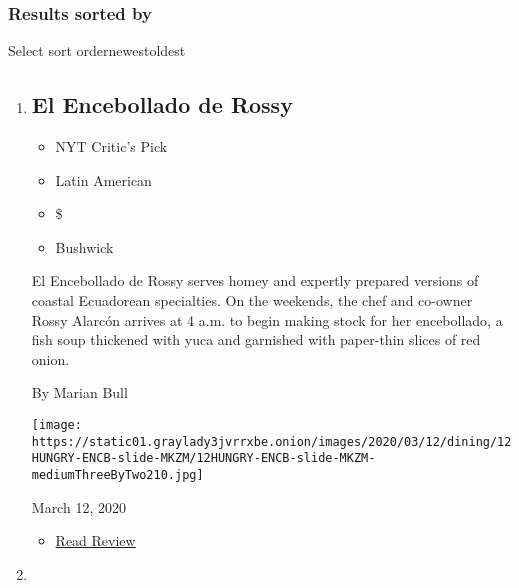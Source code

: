 \hypertarget{results--sorted-by-}{%
\subsubsection{\texorpdfstring{Results sorted by
}{Results  sorted by }}\label{results--sorted-by-}}

Select sort ordernewestoldest

\begin{enumerate}
\def\labelenumi{\arabic{enumi}.}
\item
  \href{https://www.nytimes3xbfgragh.onion/2020/03/12/dining/el-encebollado-de-rossy-review.html}{}

  \hypertarget{el-encebollado-de-rossy}{%
  \subsection{El Encebollado de Rossy}\label{el-encebollado-de-rossy}}

  \begin{itemize}
  \tightlist
  \item
    NYT Critic's Pick
  \item
    Latin American
  \item
    \$
  \item
    Bushwick
  \end{itemize}

  El Encebollado de Rossy serves homey and expertly prepared versions of
  coastal Ecuadorean specialties. On the weekends, the chef and co-owner
  Rossy Alarcón arrives at 4 a.m. to begin making stock for her
  encebollado, a fish soup thickened with yuca and garnished with
  paper-thin slices of red onion.

  By Marian Bull

  \texttt{[image: https://static01.graylady3jvrrxbe.onion/images/2020/03/12/dining/12HUNGRY-ENCB-slide-MKZM/12HUNGRY-ENCB-slide-MKZM-mediumThreeByTwo210.jpg]}

  March 12, 2020

  \begin{itemize}
  \tightlist
  \item
    \href{https://www.nytimes3xbfgragh.onion/2020/03/12/dining/el-encebollado-de-rossy-review.html?rref=collection\%2Fcollection\%2Frestaurant-guide}{Read
    Review}
  \end{itemize}
\item
  \href{https://www.nytimes3xbfgragh.onion/2020/03/10/dining/pastrami-masters-review-pete-wells.html}{}


\end{enumerate}
